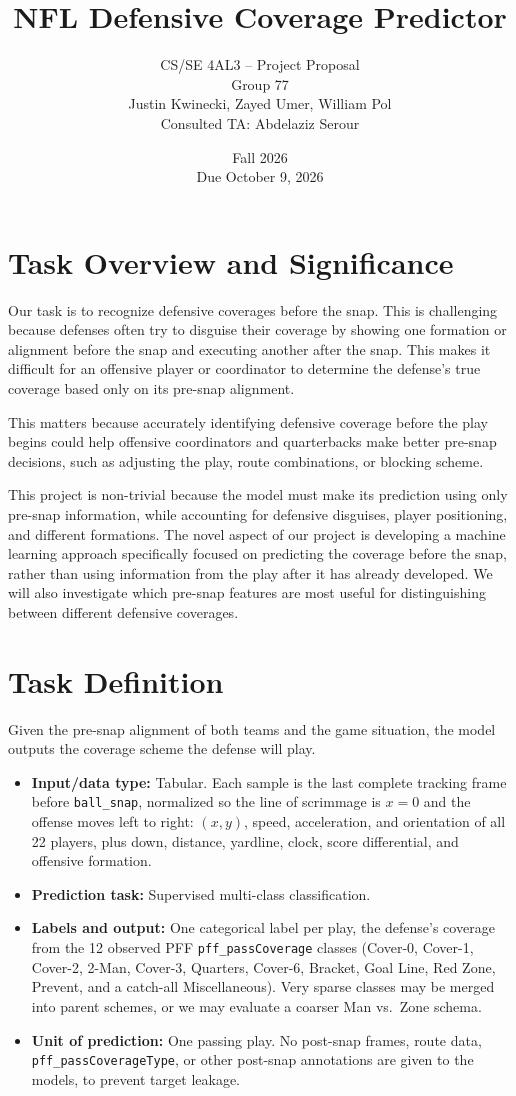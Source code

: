 \documentclass[12pt]{article}
\title{\vspace{-1.5em}\textbf{NFL Defensive Coverage Predictor}}
\author{CS/SE 4AL3 -- Project Proposal \\ Group 77 \\ Justin Kwinecki, Zayed Umer, William Pol \\ Consulted TA: Abdelaziz Serour}
\date{Fall 2026 \\ Due October 9, 2026}
\begin{document}
\maketitle
\section*{Task Overview and Significance}

Our task is to recognize defensive coverages before the snap. This is challenging because defenses often try to disguise their coverage by showing one formation or alignment before the snap and executing another after the snap. This makes it difficult for an offensive player or coordinator to determine the defense's true coverage based only on its pre-snap alignment.

This matters because accurately identifying defensive coverage before the play begins could help offensive coordinators and quarterbacks make better pre-snap decisions, such as adjusting the play, route combinations, or blocking scheme.

This project is non-trivial because the model must make its prediction using only pre-snap information, while accounting for defensive disguises, player positioning, and different formations. The novel aspect of our project is developing a machine learning approach specifically focused on predicting the coverage before the snap, rather than using information from the play after it has already developed. We will also investigate which pre-snap features are most useful for distinguishing between different defensive coverages.

\section*{Task Definition}
Given the pre-snap alignment of both teams and the game situation, the model outputs the coverage scheme the defense will play.

\begin{itemize}
  \item \textbf{Input/data type:} Tabular. Each sample is the last complete tracking frame before \texttt{ball\_snap}, normalized so the line of scrimmage is $x = 0$ and the offense moves left to right: $(x, y)$, speed, acceleration, and orientation of all 22 players, plus down, distance, yardline, clock, score differential, and offensive formation.
  \item \textbf{Prediction task:} Supervised multi-class classification.
  \item \textbf{Labels and output:} One categorical label per play, the defense's coverage from the 12 observed PFF \texttt{pff\_passCoverage} classes (Cover-0, Cover-1, Cover-2, 2-Man, Cover-3, Quarters, Cover-6, Bracket, Goal Line, Red Zone, Prevent, and a catch-all Miscellaneous). Very sparse classes may be merged into parent schemes, or we may evaluate a coarser Man vs.\ Zone schema.
  \item \textbf{Unit of prediction:} One passing play. No post-snap frames, route data, \texttt{pff\_passCoverageType}, or other post-snap annotations are given to the models, to prevent target leakage.
\end{itemize}
\end{document}
